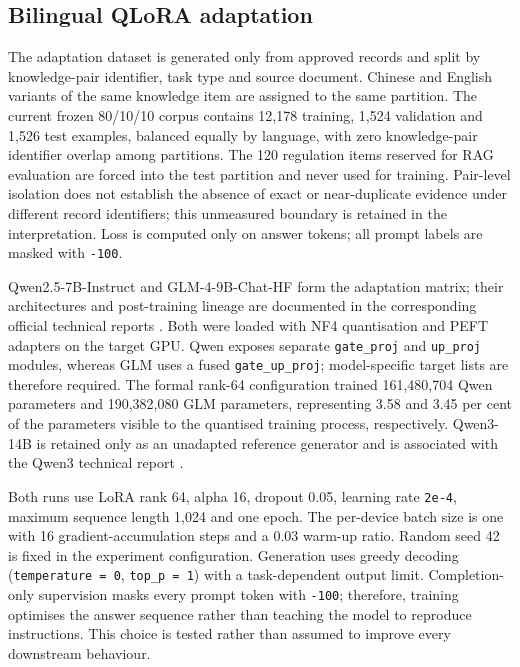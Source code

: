 \subsection{Bilingual QLoRA adaptation}

The adaptation dataset is generated only from approved records and split by knowledge-pair identifier, task type and source document. Chinese and English variants of the same knowledge item are assigned to the same partition. The current frozen 80/10/10 corpus contains 12,178 training, 1,524 validation and 1,526 test examples, balanced equally by language, with zero knowledge-pair identifier overlap among partitions. The 120 regulation items reserved for RAG evaluation are forced into the test partition and never used for training. Pair-level isolation does not establish the absence of exact or near-duplicate evidence under different record identifiers; this unmeasured boundary is retained in the interpretation. Loss is computed only on answer tokens; all prompt labels are masked with \texttt{-100}.

Qwen2.5-7B-Instruct and GLM-4-9B-Chat-HF form the adaptation matrix; their architectures and post-training lineage are documented in the corresponding official technical reports \citep{qwen2024technical,glm2024chatglm}. Both were loaded with NF4 quantisation and PEFT adapters on the target GPU. Qwen exposes separate \texttt{gate\_proj} and \texttt{up\_proj} modules, whereas GLM uses a fused \texttt{gate\_up\_proj}; model-specific target lists are therefore required. The formal rank-64 configuration trained 161,480,704 Qwen parameters and 190,382,080 GLM parameters, representing 3.58 and 3.45 per cent of the parameters visible to the quantised training process, respectively. Qwen3-14B is retained only as an unadapted reference generator and is associated with the Qwen3 technical report \citep{qwen2025technical}.

Both runs use LoRA rank 64, alpha 16, dropout 0.05, learning rate \texttt{2e-4}, maximum sequence length 1,024 and one epoch. The per-device batch size is one with 16 gradient-accumulation steps and a 0.03 warm-up ratio. Random seed 42 is fixed in the experiment configuration. Generation uses greedy decoding (\texttt{temperature = 0}, \texttt{top\_p = 1}) with a task-dependent output limit. Completion-only supervision masks every prompt token with \texttt{-100}; therefore, training optimises the answer sequence rather than teaching the model to reproduce instructions. This choice is tested rather than assumed to improve every downstream behaviour.

